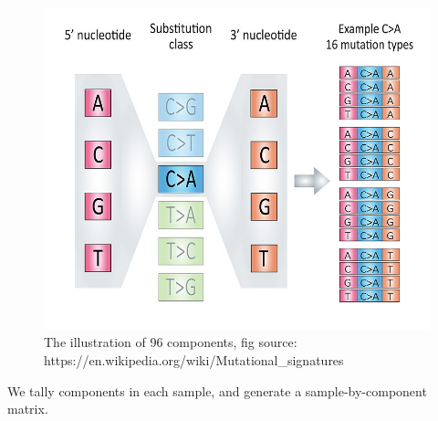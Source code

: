 \documentclass[
  12pt,
  a4paper,
  twoside]{book}
\begin{document}
\begin{figure}
\includegraphics[width=0.95\linewidth]{fig/MutationTypes_v3} \caption{The illustration of 96 components, fig source: https://en.wikipedia.org/wiki/Mutational_signatures}\label{fig:unnamed-chunk-22}
\end{figure}

We tally components in each sample, and generate a sample-by-component matrix.
\end{document}
